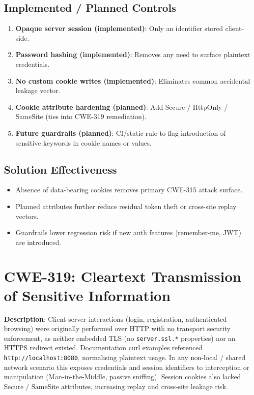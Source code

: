 \documentclass[]{UCD_CS_FYP_Report}
\begin{document}
\subsection*{Implemented / Planned Controls}
\begin{enumerate}
	\item \textbf{Opaque server session (implemented)}: Only an identifier stored client-side.
	\item \textbf{Password hashing (implemented)}: Removes any need to surface plaintext credentials.
	\item \textbf{No custom cookie writes (implemented)}: Eliminates common accidental leakage vector.
	\item \textbf{Cookie attribute hardening (planned)}: Add Secure / HttpOnly / SameSite (ties into CWE-319 remediation).
	\item \textbf{Future guardrails (planned)}: CI/static rule to flag introduction of sensitive keywords in cookie names or values.
\end{enumerate}

\subsection*{Solution Effectiveness}
\begin{itemize}
	\item Absence of data-bearing cookies removes primary CWE-315 attack surface.
	\item Planned attributes further reduce residual token theft or cross-site replay vectors.
	\item Guardrails lower regression risk if new auth features (remember-me, JWT) are introduced.
\end{itemize}


\section{CWE-319: Cleartext Transmission of Sensitive Information}

	\textbf{Description}: Client-server interactions (login, registration, authenticated browsing) were originally performed over HTTP with no transport security enforcement, as neither embedded TLS (no \texttt{server.ssl.*} properties) nor an HTTPS redirect existed. Documentation curl examples referenced \texttt{http://localhost:8080}, normalising plaintext usage. In any non-local / shared network scenario this exposes credentials and session identifiers to interception or manipulation (Man-in-the-Middle, passive sniffing). Session cookies also lacked Secure / SameSite attributes, increasing replay and cross-site leakage risk.
\end{document}
